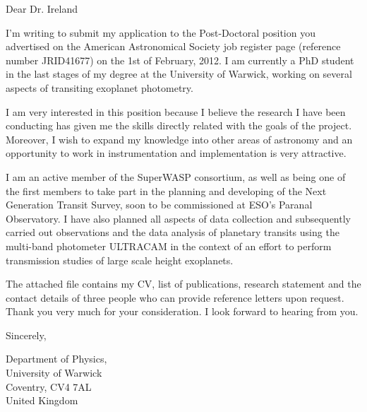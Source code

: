 \documentclass{letter}
\begin{document}
\begin{letter}{}
\opening{Dear Dr. Ireland}

I'm writing to submit my application to the Post-Doctoral position you advertised on the American Astronomical Society job register page (reference number JRID41677) on the 1st of February, 2012. I am currently a PhD student in the last stages of my degree at the University of Warwick, working on several aspects of transiting exoplanet photometry.

I am very interested in this position because I believe the research I have been conducting has given me the skills directly related with the goals of the project. Moreover, I wish to expand my knowledge into other areas of astronomy and an opportunity to work in instrumentation and implementation is very attractive.

I am an active member of the SuperWASP consortium, as well as being one of the first members to take part in the planning and developing of the Next Generation Transit Survey, soon to be commissioned at ESO's Paranal Observatory. I have also planned all aspects of data collection and subsequently carried out observations and the data analysis of planetary transits using the multi-band photometer ULTRACAM in the context of an effort to perform transmission studies of large scale height exoplanets.

The attached file contains my CV, list of publications, research statement and the contact details of three people who can provide reference letters upon request. Thank you very much for your consideration. I look forward to hearing from you. 

\closing{Sincerely,}

Department of Physics, \\University of Warwick \\ Coventry, CV4 7AL \\ United Kingdom
\end{letter}
\end{document}
